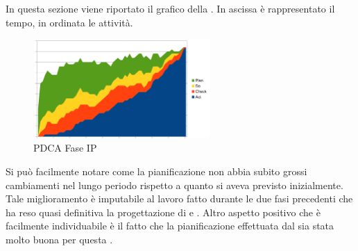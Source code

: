 	In questa sezione viene riportato il grafico  della . In ascissa è rappresentato il tempo, in ordinata le attività.
	\begin{figure}[H]
		\centering
		\includegraphics[width=0.6\textwidth]{PianoDiQualifica/Pics/GraficoPDCAFaseIP.png}
		\caption{PDCA Fase IP}
	\end{figure}

	Si può facilmente notare come la pianificazione non abbia subito grossi cambiamenti nel lungo periodo rispetto a quanto si aveva previsto inizialmente. Tale miglioramento è imputabile al lavoro fatto durante le due fasi precedenti che ha reso quasi definitiva la progettazione di  e . Altro aspetto positivo che è facilmente individuabile è il fatto che la pianificazione effettuata dal  sia stata molto buona per questa .